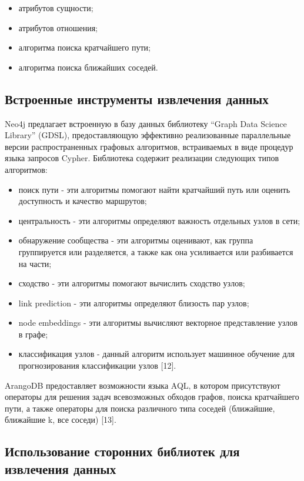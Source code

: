 \begin{itemize}
    \item атрибутов сущности;
    \item атрибутов отношения;
    \item алгоритма поиска кратчайшего пути;
    \item алгоритма поиска ближайших соседей.
\end{itemize}

\subsection{Встроенные инструменты извлечения данных}

Neo4j предлагает встроенную в базу данных библиотеку “Graph Data Science Library” (GDSL), предоставляющую эффективно реализованные
параллельные версии распространенных графовых алгоритмов, встраиваемых в виде процедур языка запросов Cypher. Библиотека содержит
реализации следующих типов алгоритмов:

\begin{itemize}
    \item поиск пути - эти алгоритмы помогают найти кратчайший путь или оценить доступность и качество маршрутов;
    \item центральность - эти алгоритмы определяют важность отдельных узлов в сети;
    \item обнаружение сообщества - эти алгоритмы оценивают, как группа группируется или разделяется, а также как она усиливается или разбивается на части;
    \item сходство - эти алгоритмы помогают вычислить сходство узлов;
    \item link prediction - эти алгоритмы определяют близость пар узлов;
    \item node embeddings - эти алгоритмы вычисляют векторное представление узлов в графе;
    \item классификация узлов - данный алгоритм использует машинное обучение для прогнозирования классификации узлов [12].
\end{itemize}

ArangoDB предоставляет возможности языка AQL, в котором присутствуют операторы для решения задач всевозможных обходов графов, поиска
кратчайшего пути, а также операторы для поиска различного типа соседей (ближайшие, ближайшие k, все соседи) [13].

\subsection{Использование сторонних библиотек для извлечения данных}

